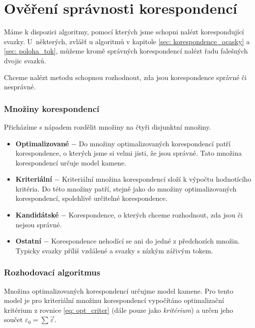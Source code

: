 \part{Ověření správnosti korespondencí}	
	
	Máme k dispozici algoritmy, pomocí kterých jsme schopni nalézt korespondující svazky. U~některých, zvlášť u algoritmů v kapitole  \ref{sec: korespondence_ocasky} a \ref{sec: poloha_tok}, můžeme kromě správných korespondencí nalézt řadu falešných  dvojic svazků.
	
	Chceme nalézt metodu schopnou rozhodnout, zda jsou korespondence správné či nesprávné. 
	\vspace{4mm}
	
\section{Množiny korespondencí}
Přicházíme s nápadem rozdělit množiny na čtyři disjunktní množiny.

	\begin{itemize}
	\item \textbf{Optimalizované} $-$  Do množiny optimalizovaných korespondencí patří korespondence, o kterých jsme si velmi jisti, že jsou správné. Tato množina korespondencí určuje model kamene. 
	
	\item \textbf{Kriteriální} $-$ Kriteriální množina korespondencí složí k výpočtu hodnotícího kritéria. Do této množiny patří, stejně jako do množiny optimalizovaných korespondencí, spolehlivě určitelné korespondence.  
	
	\item \textbf{Kandidátské} $-$ Korespondence, o kterých chceme rozhodnout, zda jsou či nejsou správné.  
	
	\item \textbf{Ostatní} $-$ Korespondence nehodící se ani do jedné z předchozích množin. Typicky svazky příliš vzdálené a svazky s nízkým zářivým tokem.  
\end{itemize}		
	
\section{Rozhodovací algoritmus}
	Množina optimalizovaných korespondencí určujme model kamene. Pro tento model je pro kriteriální množinu korespondencí vypočítáno optimalizační kritérium z rovnice \ref{eq: opt_criter} (dále pouze jako \textit{kritérium}) a určen jeho součet $\varepsilon_0 = \sum\vec{\varepsilon}$.
	 
